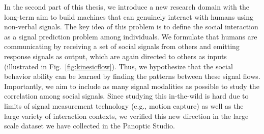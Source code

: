 In the second part of this thesis, we introduce a new research domain with the long-term aim to build machines that can genuinely interact with humans using non-verbal signals. The key idea of this problem is to define the social interaction as a signal prediction problem among individuals. We formulate that humans are communicating by receiving a set of social signals from others and emitting response signals as output, which are again directed to others as inputs (illustrated in Fig.~\ref{fig:kinesicflow}). Thus, we hypothesize that the social behavior ability can be learned by finding the patterns between these signal flows. Importantly, we aim to include as many signal modalities as possible to study the correlation among social signals. Since studying this in-the-wild is hard due to limits of signal measurement technology (e.g., motion capture) as well as the large variety of interaction contexts, we verified this new direction in the large scale dataset we have collected in the Panoptic Studio. %


%
%
% 
% 
% 
% 
 
